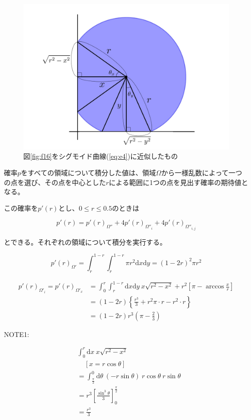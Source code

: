\begin{figure}[H]
    \begin{center}
        \includegraphics[width=12.5cm]{../img/omega_xy.jpg}
        \caption{図\ref{fig:f16}をシグモイド曲線(\ref{eq:e4})に近似したもの}
        \label{fig:f22}
    \end{center}
\end{figure}

確率$p$をすべての領域について積分した値は、領域$\Omega$から一様乱数によって一つの点を選び、その点を中心とした$r$による範囲に1つの点を見出す確率の期待値となる。

この確率を$p'(r)$とし、$0\le r \le 0.5$のときは

$$p'(r) = p'(r)_{\Omega''} + 4p'(r)_{\Omega''_{i}} + 4p'(r)_{\Omega''_{i,j}}$$

とできる。それぞれの領域について積分を実行する。

$$p'(r)_{\Omega'} = \int_{r}^{1-r} \int_{r}^{1-r}\pi r^{2}\mathrm{d}x\mathrm{d}y = (1-2r)^{2}\pi r^{2}$$

\begin{align}
p'(r)_{\Omega'_{i}} = p'(r)_{\Omega'_{x}} &= \int_{0}^{r} \int_{r}^{1-r}\mathrm{d}x\mathrm{d}y\ x\sqrt{r^{2}-x^{2}} + r^{2}\left[\pi - \arccos\frac{x}{r}\right]\nonumber \\
&= (1-2r)\left\{ \frac{r^{3}}{3} + r^{2}\pi\cdot r - r^{2}\cdot r \right\}\nonumber \\
&= (1-2r)r^{3}\left( \pi-\frac{2}{3} \right)
\end{align}

NOTE1:

\begin{align}
&\int_{0}^{r}\mathrm{d}x\ x\sqrt{r^{2}-x^{2}} \nonumber \\
&\ \ \ \ \ \left[x = r\cos \theta \right]\nonumber \\
&= \int_{\frac{\pi}{2}}^{0}\mathrm{d}\theta\ (-r\sin\theta)\ r\cos\theta\ r\sin\theta\nonumber \\
&= r^{3}\left[ \frac{\sin^{3}\theta}{3}\right]^{\frac{\pi}{2}}_{0} \nonumber \\
&= \frac{r^{3}}{3}
\end{align}

